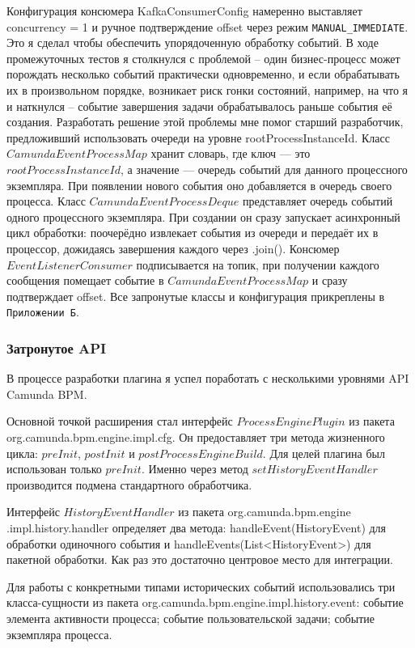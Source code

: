 Конфигурация консюмера KafkaConsumerConfig намеренно выставляет
concurrency = 1 и ручное подтверждение offset через режим
\texttt{MANUAL\_IMMEDIATE}. Это я сделал чтобы обеспечить упорядоченную обработку событий. 
В ходе промежуточных тестов я столкнулся с проблемой --
один бизнес-процесс может порождать несколько событий практически одновременно, и если
обрабатывать их в произвольном порядке, возникает риск гонки состояний, например, на что я и наткнулся -- 
событие завершения задачи обрабатывалось раньше события её создания. Разработать решение этой проблемы мне помог
старший разработчик, предложивший использовать очереди на уровне rootProcessInstanceId. Класс $CamundaEventProcessMap$ хранит словарь, где ключ — это
$rootProcessInstanceId$, а значение — очередь событий для данного процессного экземпляра. При появлении
нового события оно добавляется в очередь своего процесса. Класс $CamundaEventProcessDeque$ представляет очередь событий одного
процессного экземпляра. При создании он сразу запускает асинхронный цикл обработки: поочерёдно извлекает
события из очереди и передаёт их в процессор, дожидаясь завершения каждого через .join().
Консюмер $EventListenerConsumer$ подписывается на топик, при получении каждого сообщения помещает событие в $CamundaEventProcessMap$ и сразу
подтверждает offset. Все запронутые классы и конфигурация прикреплены в \texttt{Приложении Б}.

\subsubsection{Затронутое API}
В процессе разработки плагина я успел поработать с несколькими уровнями API Camunda BPM.
                                                                        
Основной точкой расширения стал интерфейс $ProcessEnginePlugin$ из пакета
org.camunda.bpm.engine.impl.cfg. Он предоставляет три метода          
жизненного цикла: $preInit$, $postInit$ и $postProcessEngineBuild$. Для целей
плагина был использован только $preInit$. Именно через метод
$setHistoryEventHandler$ производится подмена стандартного обработчика.

Интерфейс $HistoryEventHandler$ из пакета
org.camunda.bpm.engine .impl.history.handler определяет два метода:
handleEvent(HistoryEvent) для обработки одиночного события и
handleEvents(List<HistoryEvent>) для пакетной обработки. 
Как раз это достаточно центровое место для интеграции.

Для работы с конкретными типами исторических событий использовались три
класса-сущности из пакета org.camunda.bpm.engine.impl.history.event:
событие элемента активности процесса;
событие пользовательской задачи;
событие экземпляра процесса.
                                                                        
